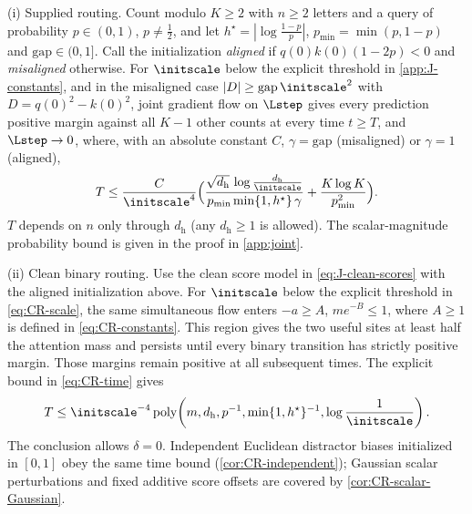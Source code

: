 \begin{theorem}
\label{thm:joint}
\textnormal{(i) Supplied routing.} Count modulo $K\ge2$ with $n\ge2$ letters and a query of probability $p\in(0,1)$, $p\neq\tfrac{1}{2}$, and let $h^\star=|\log\tfrac{1-p}{p}|$,
$p_{\min}=\min(p,1-p)$ and $\mathrm{gap}\in(0,1]$. Call the initialization \emph{aligned} if $q(0)k(0)(1-2p)<0$ and \emph{misaligned} otherwise.
For $\initscale$ below the explicit threshold in \cref{app:J-constants}, and in the misaligned case
$|D|\ge\mathrm{gap}\,\initscale^2$ with $D=q(0)^2-k(0)^2$, joint gradient flow on $\Lstep$ gives
every prediction positive margin against all $K-1$ other counts at every time $t\ge T$, and $\Lstep\to0$, where, with an absolute constant $C$,
$\gamma=\mathrm{gap}$ (misaligned) or $\gamma=1$ (aligned),
\[
 T\le\frac{C}{\initscale^4}\Bigl(\frac{\sqrt{d_{\mathrm h}}\,\log\frac{d_{\mathrm h}}{\initscale}}{p_{\min}\min\{1,h^\star\}\,\gamma}+\frac{K\log K}{p_{\min}^2}\Bigr).
\]
$T$ depends on $n$ only through $d_{\mathrm h}$ (any $d_{\mathrm h}\ge1$ is allowed).
The scalar-magnitude probability bound is given in the proof in \cref{app:joint}.

\textnormal{(ii) Clean binary routing.} Use the clean score model in \cref{eq:J-clean-scores} with the aligned initialization above.
For $\initscale$ below the explicit threshold in \cref{eq:CR-scale}, the same simultaneous flow
enters $-a\ge A$, $me^{-B}\le1$, where $A\ge1$ is defined in \cref{eq:CR-constants}.
This region gives the two useful sites at least half the attention mass and persists until every binary transition has
strictly positive margin. Those margins remain positive at all subsequent times. The explicit bound in \cref{eq:CR-time} gives
\[
 T\le\initscale^{-4}\operatorname{poly}\!\left(m,d_{\mathrm h},p^{-1},
 \min\{1,h^\star\}^{-1},\log\frac1{\initscale}\right).
\]
The conclusion allows $\delta=0$. Independent Euclidean distractor biases initialized in $[0,1]$ obey the same time bound
(\cref{cor:CR-independent}); Gaussian scalar perturbations and fixed additive score offsets are covered by \cref{cor:CR-scalar-Gaussian}.
\end{theorem}

